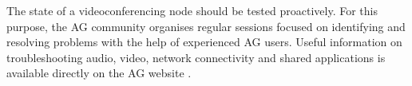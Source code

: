 The state of a videoconferencing node should be tested proactively. For this purpose, the AG community organises regular sessions focused on identifying and resolving problems with the help of experienced AG users. Useful information on troubleshooting audio, video, network connectivity and shared applications is available directly on the AG website \cite{AG-QualityAssurancePreparation}.

\proofed
